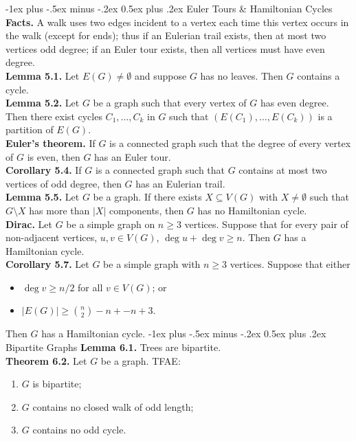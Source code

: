 \documentclass[10pt,landscape]{article}
\makeatletter
\renewcommand{\section}{\@startsection{section}{1}{0mm}%
                                {-1ex plus -.5ex minus -.2ex}%
                                {0.5ex plus .2ex}%
                                {\normalfont\large\bfseries}}
\makeatother
\begin{document}
\begin{multicols}{3}
\section{Euler Tours \& Hamiltonian Cycles}
\textbf{Facts.} A walk uses two edges incident to a vertex each time this vertex occurs in the walk (except for ends); thus if an Eulerian trail exists, then at most two vertices odd degree; if an Euler tour exists, then all vertices must have even degree. \\ 
\textbf{Lemma 5.1.} Let \( E(G) \neq \emptyset  \) and suppose \( G \) has no leaves. Then \( G \) contains a cycle. \\
\textbf{Lemma 5.2.} Let \( G \) be a graph such that every vertex of \( G \) has even degree. Then there exist cycles \( C_1, \hdots , C_k \) in \( G \) such that \( (E(C_1), \hdots , E(C_k)) \) is a partition of \( E(G). \) \\
\textbf{Euler's theorem.} If \( G \) is a connected graph such that the degree of every vertex of \( G \) is even, then \( G \) has an Euler tour. \\
\textbf{Corollary 5.4.} If \( G \) is a connected graph such that \( G \) contains at most two vertices of odd degree, then \( G \) has an Eulerian trail. \\
\textbf{Lemma 5.5.} Let \( G \) be a graph. If there exists \( X \subseteq V(G) \) with \( X \neq \emptyset  \) such that \( G \setminus X \) has more than \( |X| \) components, then \( G \) has no Hamiltonian cycle. \\
\textbf{Dirac.} Let \( G \) be a simple graph on \( n \geq 3\) vertices. Suppose that for every pair of non-adjacent vertices, \( u ,v \in V(G) \), \( \deg u + \deg v \geq n \). Then \( G \) has a Hamiltonian cycle. \\
\textbf{Corollary 5.7.} Let \( G \) be a simple graph with \( n \geq 3 \) vertices. Suppose that either
\begin{itemize}
	\item \( \deg v \geq n / 2 \) for all \( v \in V(G) \); or
	\item \(|E(G)| \geq \binom{n}{2} - n +- n +3.\)
	
	
\end{itemize}
Then \( G \) has a Hamiltonian cycle.
\section{Bipartite Graphs}
\textbf{Lemma 6.1.} Trees are bipartite. \\
\textbf{Theorem 6.2.} Let \( G \) be a graph. TFAE:
\begin{enumerate}
	\item \( G \) is bipartite;
	\item \( G \) contains no closed walk of odd length;
	\item \( G \) contains no odd cycle.
\end{enumerate}


\end{multicols}
\end{document}
